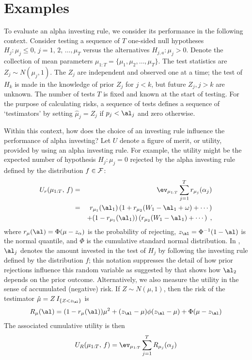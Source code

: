 \documentclass[12pt]{article}
\begin{document}
\section{ Examples }
 
 To evaluate an alpha investing rule, we consider its performance in the
 following context.  Consider testing a sequence of $T$ one-sided null
 hypotheses $H_j: \mu_j \le 0, \, j=1,\,2,\, \ldots, \mu_T$ versus the alternatives
 $H_{j,a}: \mu_j > 0$.   Denote the collection of mean
 parameters $\mu_{1:T} = \{\mu_1, \mu_2, \ldots, \mu_T\}$.  The test statistics
 are $Z_j \sim N(\mu_j,1)$.  The $Z_j$ are independent and observed one at a
 time; the test of $H_k$ is made in the knowledge of prior $Z_j$ for $j<k$, but
 future $Z_j, j > k$ are unknown.  The number of tests $T$ is fixed and known at
 the start of testing.  For the purpose of calculating risks, a sequence of
 tests defines a sequence of `testimators' by setting $\hat\mu_j = Z_j$ if
 $p_j<\al_j$ and zero otherwise.
 

 Within this context, how does the choice of an investing rule influence the
 performance of alpha investing?  Let $U$ denote a figure of merit, or utility,
 provided by using an alpha investing rule.  For example, the utility might be
 the expected number of hypothesis $H_j:\mu_j=0$ rejected by the alpha investing
 rule defined by the distribution $f \in {\cal F}$:
 \begin{eqnarray}
    U_r(\mu_{1:T},\,f) 
      &=& \ev_{\mu_{1:T}} \sum_{j=1}^T r_{\mu_j}(\alpha_j) \label{eq:Ur} \\
      &=& r_{\mu_1}(\al_1) \left( 1 + r_{\mu_2}(W_1-\al_1+\omega) + \cdots \right)\cr
      & &  + (1-r_{\mu_1}(\al_1))\left( r_{\mu_2}(W_1-\al_1) + \cdots \right) \;,
 \label{eq:Ure}
 \end{eqnarray}
 where $r_\mu(\al) = \Phi(\mu - z_\alpha)$ is the probability of rejecting,
 $z_\al = \Phi^{-1}(1-\al)$ is the normal quantile, and $\Phi$ is the cumulative
 standard normal distribution.  In , $\al_j$ denotes the amount
 invested in the test of $H_j$ by following the investing rule defined by the
 distribution $f$; this notation suppresses the detail of how prior rejections
 influence this random variable as suggested by  that shows how
 $\al_2$ depends on the prior outcome.  Alternatively, we also measure the
 utility in the sense of accumulated (negative) risk.  If $Z \sim N(\mu,1)$,
 then the risk of the testimator $\hat\mu = Z \,I_{\{Z < z_\al\}}$ is
 \begin{equation}
   R_{\mu}(\al) = (1-r_\mu(\al))\mu^2 + (z_\al-\mu)\phi(z_\al-\mu) + \Phi(\mu-z_\al)
 \label{eq:Rmu}
 \end{equation}
 The associated cumulative utility is then
 \begin{equation}
    U_R(\mu_{1:T},\,f) = \ev_{\mu_{1:T}} \sum_{j=1}^T R_{\mu_j}(\alpha_j) 
 \label{eq:UR}
 \end{equation}
 
\end{document}
